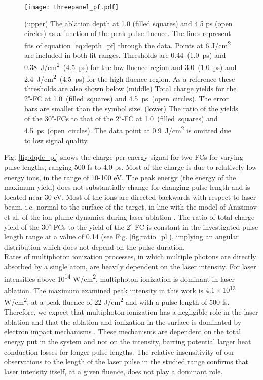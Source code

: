\documentclass[aip, jap, reprint, amsmath, amssymb]{revtex4-1}
\begin{document}
\begin{figure}[]
\texttt{[image: threepanel\_pf.pdf]}
\caption{
(upper) The ablation depth at 1.0 (filled squares) and 4.5 ps (open circles) as a function of the peak pulse fluence. The lines represent fits of equation \ref{eq:depth_pf} through the data.  Points at 6 J/cm\textsuperscript{2} are included in both fit ranges. Thresholds are \mbox{0.44 (1.0 ps)} and \mbox{0.38 J/cm\textsuperscript{2} (4.5 ps)} for the low fluence region and \mbox{3.0 (1.0 ps)} and \mbox{2.4 J/cm\textsuperscript{2} (4.5 ps)} for the high fluence region. As a reference these thresholds are also shown below (middle) Total charge yields for the \mbox{2\textsuperscript{$\circ$}-FC} at \mbox{1.0 (filled squares)} and \mbox{4.5 ps (open circles)}. The error bars are smaller than the symbol size. (lower) The ratio of the yields of the \mbox{30\textsuperscript{$\circ$}-FCs} to that of the \mbox{2\textsuperscript{$\circ$}-FC} at \mbox{1.0 (filled squares)} and \mbox{4.5 ps (open circles)}. The data point at \mbox{0.9 J/cm\textsuperscript{2}} is omitted due to low signal quality.
}
\label{fig:threepanel_pf}
\end{figure}

Fig. \ref{fig:dqde_pl} shows the charge-per-energy signal for two FCs for varying pulse lengths, ranging 500 fs to 4.0 ps. Most of the charge is due to relatively low-energy ions, in the range of 10-100 eV. The peak energy (the energy of the maximum yield) does not substantially change for changing pulse length and is located near 30 eV. Most of the ions are directed backwards with respect to laser beam, i.e. normal to the surface of the target, in line with the model of Anisimov et al. of the ion plume dynamics during laser ablation \cite{anisimov1993}. The ratio of total charge yield of the 30\textsuperscript{$\circ$}-FCs to the yield of the 2\textsuperscript{$\circ$}-FC is constant in the investigated pulse length range at a value of 0.14 (see Fig. \ref{fig:ratio_pl}), implying an angular distribution which does not depend on the pulse duration. \\

Rates of multiphoton ionization processes, in which multiple photons are directly absorbed by a single atom, are heavily dependent on the laser intensity. For laser intensities above 10\textsuperscript{14} W/cm\textsuperscript{2}, multiphoton ionization is dominant in laser ablation\cite{gamaly2011}. The maximum examined peak intensity in this work is $4.1 \times 10$\textsuperscript{13} W/cm\textsuperscript{2}, at a peak fluence of 22 J/cm\textsuperscript{2} and with a pulse length of 500 fs. Therefore, we expect that multiphoton ionization has a negligible role in the laser ablation and that the ablation and ionization in the surface is dominated by electron impact mechanisms \cite{gamaly2011}. These mechanisms are dependent on the total energy put in the system and not on the intensity, barring potential larger heat conduction losses for longer pulse lengths\cite{harzic2005,nolte1997}. The relative insensitivity of our observations to the length of the laser pulse in the studied range confirms that laser intensity itself, at a given fluence, does not play a dominant role. 
\end{document}
